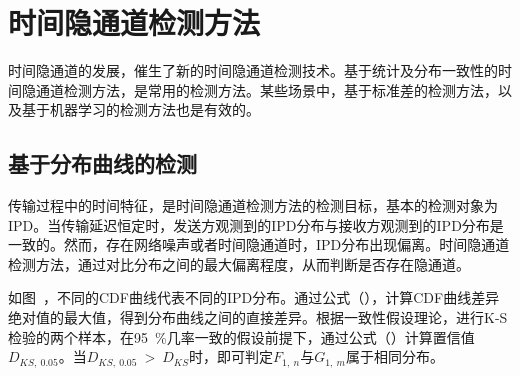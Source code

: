 \section{时间隐通道检测方法}
\label{chap:backinfo:detect}

时间隐通道的发展，催生了新的时间隐通道检测技术。基于统计及分布一致性的时间隐通道检测方法，是常用的检测方法。某些场景中，基于标准差的检测方法，以及基于机器学习的检测方法也是有效的。

\subsection{基于分布曲线的检测}
\label{chap:backinfo:detect:statistical}

传输过程中的时间特征，是时间隐通道检测方法的检测目标，基本的检测对象为IPD。当传输延迟恒定时，发送方观测到的IPD分布与接收方观测到的IPD分布是一致的。然而，存在网络噪声或者时间隐通道时，IPD分布出现偏离。时间隐通道检测方法，通过对比分布之间的最大偏离程度，从而判断是否存在隐通道。

如图\ ，不同的CDF曲线代表不同的IPD分布。通过公式（），计算CDF曲线差异绝对值的最大值，得到分布曲线之间的直接差异。根据一致性假设理论，进行K-S检验的两个样本，在{95\ \%}几率一致的假设前提下，通过公式（）计算置信值$D_{KS,\ 0.05}$。当$D_{KS,\ 0.05}\ >\ D_{KS}$时，即可判定$F_{1,\ n}$与$G_{1,\ m}$属于相同分布。

